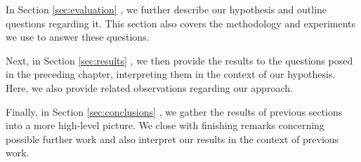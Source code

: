 In Section \ref{sec:evaluation} , we further describe our hypothesis and outline questions regarding it. This section also covers the methodology and experiments we use to answer these questions.

Next, in Section \ref{sec:results} , we then provide the results to the questions posed in the preceding chapter, interpreting them in the context of our hypothesis.
Here, we also provide related observations regarding our approach.

Finally, in Section \ref{sec:conclusions} , we gather the results of previous sections into a more high-level picture.
We close with finishing remarks concerning possible further work and also interpret our results in the context of previous work.